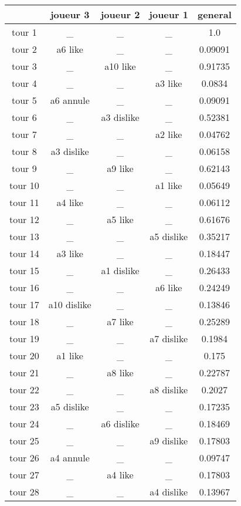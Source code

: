 \documentclass{article}
\begin{document}
\begin{tabular}{|c|c|c|c|c|}
\hline
& joueur 3 & joueur 2 & joueur 1 & general \\
\hline
tour 1 & \_ & \_ & \_ & 1.0 \\
\hline
tour 2 & a6 like & \_ & \_ & 0.09091 \\
\hline
tour 3 & \_ & a10 like & \_ & 0.91735 \\
\hline
tour 4 & \_ & \_ & a3 like & 0.0834 \\
\hline
tour 5 & a6 annule & \_ & \_ & 0.09091 \\
\hline
tour 6 & \_ & a3 dislike & \_ & 0.52381 \\
\hline
tour 7 & \_ & \_ & a2 like & 0.04762 \\
\hline
tour 8 & a3 dislike & \_ & \_ & 0.06158 \\
\hline
tour 9 & \_ & a9 like & \_ & 0.62143 \\
\hline
tour 10 & \_ & \_ & a1 like & 0.05649 \\
\hline
tour 11 & a4 like & \_ & \_ & 0.06112 \\
\hline
tour 12 & \_ & a5 like & \_ & 0.61676 \\
\hline
tour 13 & \_ & \_ & a5 dislike & 0.35217 \\
\hline
tour 14 & a3 like & \_ & \_ & 0.18447 \\
\hline
tour 15 & \_ & a1 dislike & \_ & 0.26433 \\
\hline
tour 16 & \_ & \_ & a6 like & 0.24249 \\
\hline
tour 17 & a10 dislike & \_ & \_ & 0.13846 \\
\hline
tour 18 & \_ & a7 like & \_ & 0.25289 \\
\hline
tour 19 & \_ & \_ & a7 dislike & 0.1984 \\
\hline
tour 20 & a1 like & \_ & \_ & 0.175 \\
\hline
tour 21 & \_ & a8 like & \_ & 0.22787 \\
\hline
tour 22 & \_ & \_ & a8 dislike & 0.2027 \\
\hline
tour 23 & a5 dislike & \_ & \_ & 0.17235 \\
\hline
tour 24 & \_ & a6 dislike & \_ & 0.18469 \\
\hline
tour 25 & \_ & \_ & a9 dislike & 0.17803 \\
\hline
tour 26 & a4 annule & \_ & \_ & 0.09747 \\
\hline
tour 27 & \_ & a4 like & \_ & 0.17803 \\
\hline
tour 28 & \_ & \_ & a4 dislike & 0.13967 \\

\end{tabular}
\end{document}
